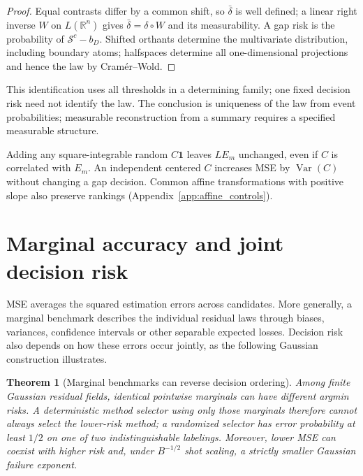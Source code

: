 \documentclass[a4paper,onecolumn,unpublished,nopdfoutputerror]{quantumarticle}
\theoremstyle{plain}
\newtheorem{theorem}{Theorem}[section]
\theoremstyle{definition}
\newcommand{\Var}{\operatorname{Var}}
\newcommand{\calS}{\mathcal{S}}
\newcommand{\R}{\mathbb{R}}
\newcommand{\1}{\mathbf{1}}
\begin{document}
\begin{proof}
Equal contrasts differ by a common shift, so $\bar\delta$ is well defined; a linear right inverse $W$ on $L(\R^n)$ gives $\bar\delta=\delta\circ W$ and its measurability. A gap risk is the probability of $\calS^c-b_D$. Shifted orthants determine the multivariate distribution, including boundary atoms; halfspaces determine all one-dimensional projections and hence the law by Cram\'er--Wold.
\end{proof}

This identification uses all thresholds in a determining family; one fixed decision risk need not identify the law. The conclusion is uniqueness of the law from event probabilities; measurable reconstruction from a summary requires a specified measurable structure.

Adding any square-integrable random $C\1$ leaves $LE_m$ unchanged, even if $C$ is correlated with $E_m$. An independent centered $C$ increases MSE by $\Var(C)$ without changing a gap decision. Common affine transformations with positive slope also preserve rankings (Appendix~\ref{app:affine_controls}).


\section{Marginal accuracy and joint decision risk}
\label{sec:marginal_obstruction}

MSE averages the squared estimation errors across candidates. More generally, a marginal benchmark describes the individual residual laws through biases, variances, confidence intervals or other separable expected losses. Decision risk also depends on how these errors occur jointly, as the following Gaussian construction illustrates.

\begin{theorem}[Marginal benchmarks can reverse decision ordering]
\label{thm:nogo_marginal}
Among finite Gaussian residual fields, identical pointwise marginals can have different argmin risks. A deterministic method selector using only those marginals therefore cannot always select the lower-risk method; a randomized selector has error probability at least $1/2$ on one of two indistinguishable labelings. Moreover, lower MSE can coexist with higher risk and, under $B^{-1/2}$ shot scaling, a strictly smaller Gaussian failure exponent.
\end{theorem}
\end{document}
